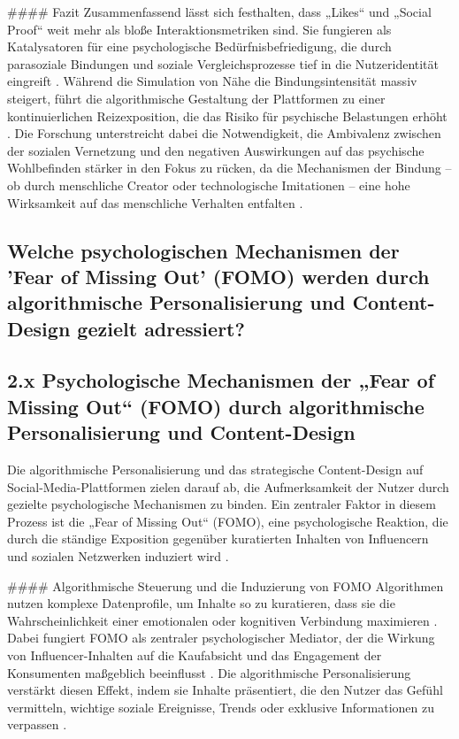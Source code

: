 \documentclass[11pt,a4paper]{article}
\begin{document}
\#\#\#\# Fazit Zusammenfassend lässt sich festhalten, dass „Likes“ und „Social Proof“ weit mehr als bloße Interaktionsmetriken sind. Sie fungieren als Katalysatoren für eine psychologische Bedürfnisbefriedigung, die durch parasoziale Bindungen und soziale Vergleichsprozesse tief in die Nutzeridentität eingreift \autocite{openalex_W2946816985,europepmc_42073973}. Während die Simulation von Nähe die Bindungsintensität massiv steigert, führt die algorithmische Gestaltung der Plattformen zu einer kontinuierlichen Reizexposition, die das Risiko für psychische Belastungen erhöht \autocite{grey_grey_5d5c282590c448fc8776b04f78a08de5,grey_grey_3467cac0f11d4b1e86319128da218a3e}. Die Forschung unterstreicht dabei die Notwendigkeit, die Ambivalenz zwischen der sozialen Vernetzung und den negativen Auswirkungen auf das psychische Wohlbefinden stärker in den Fokus zu rücken, da die Mechanismen der Bindung – ob durch menschliche Creator oder technologische Imitationen – eine hohe Wirksamkeit auf das menschliche Verhalten entfalten \autocite{arxiv_2301_09025,grey_grey_f99abd6bfbd04efc8def60bb6988ce35}.

\subsection{Welche psychologischen Mechanismen der 'Fear of Missing Out' (FOMO) werden durch algorithmische Personalisierung und Content-Design gezielt adressiert?}

\subsection{2.x Psychologische Mechanismen der „Fear of Missing Out“ (FOMO) durch algorithmische Personalisierung und Content-Design}

Die algorithmische Personalisierung und das strategische Content-Design auf Social-Media-Plattformen zielen darauf ab, die Aufmerksamkeit der Nutzer durch gezielte psychologische Mechanismen zu binden. Ein zentraler Faktor in diesem Prozess ist die „Fear of Missing Out“ (FOMO), eine psychologische Reaktion, die durch die ständige Exposition gegenüber kuratierten Inhalten von Influencern und sozialen Netzwerken induziert wird \autocite{doaj_11fd8100d4c74b18ab12a6bed2c1d2c0}.

\#\#\#\# Algorithmische Steuerung und die Induzierung von FOMO Algorithmen nutzen komplexe Datenprofile, um Inhalte so zu kuratieren, dass sie die Wahrscheinlichkeit einer emotionalen oder kognitiven Verbindung maximieren \autocite{crossref_10_22215_etd_2019_13484}. Dabei fungiert FOMO als zentraler psychologischer Mediator, der die Wirkung von Influencer-Inhalten auf die Kaufabsicht und das Engagement der Konsumenten maßgeblich beeinflusst \autocite{doaj_11fd8100d4c74b18ab12a6bed2c1d2c0}. Die algorithmische Personalisierung verstärkt diesen Effekt, indem sie Inhalte präsentiert, die den Nutzer das Gefühl vermitteln, wichtige soziale Ereignisse, Trends oder exklusive Informationen zu verpassen \autocite{doaj_11fd8100d4c74b18ab12a6bed2c1d2c0}.
\end{document}
